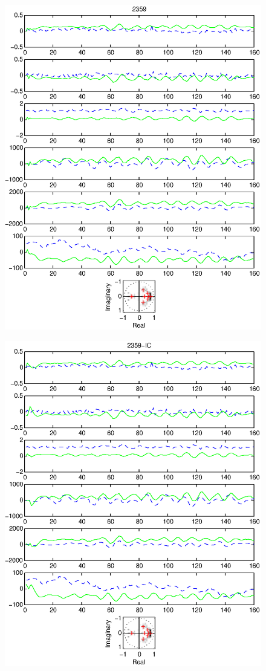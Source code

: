 \documentclass{article}
\begin{document}
\begin{figure}[htb!]\centering
\includegraphics{2359.eps}
\end{figure}\clearpage
\begin{figure}[htb!]\centering
\includegraphics{2359_ic.eps}
\end{figure}\clearpage
\end{document}
